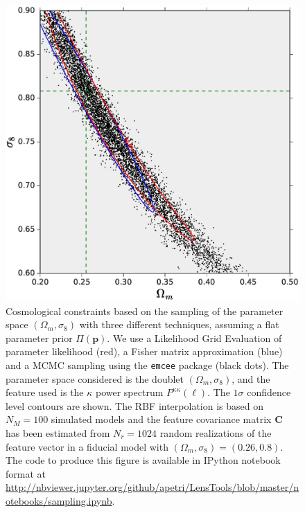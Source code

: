 \documentclass[5p]{elsarticle}
\newcommand{\bb}[1]{\mathbf{#1}}
\newcommand{\ttt}[1]{\texttt{#1}}
\begin{document}
\begin{figure}
\begin{center}
\includegraphics[scale=0.4]{Figures/parameter_sampling.eps}
\caption{Cosmological constraints based on the sampling of the parameter space $(\Omega_m,\sigma_8)$ with three different techniques, assuming a flat parameter prior $\Pi(\bb{p})$. We use a Likelihood Grid Evaluation of parameter likelihood (red), a Fisher matrix approximation (blue) and a MCMC sampling using the \ttt{emcee} package (black dots). The parameter space considered is the doublet $(\Omega_m,\sigma_8)$, and the feature used is the $\kappa$ power spectrum $P^{\kappa\kappa}(\ell)$. The $1\sigma$ confidence level contours are shown. The RBF interpolation is based on $N_M=100$ simulated models and the feature covariance matrix $\bb{C}$ has been estimated from $N_r=1024$ random realizations of the feature vector in a fiducial model with $(\Omega_m,\sigma_8)=(0.26,0.8)$. The code to produce this figure is available in {\sc IPython} notebook format at \url{http://nbviewer.jupyter.org/github/apetri/LensTools/blob/master/notebooks/sampling.ipynb}.}
\label{samplingfig}
\end{center}
\end{figure}

\end{document}
